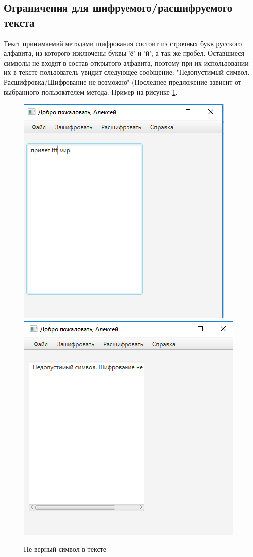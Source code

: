 \documentclass[a4paper,12pt]{article}
\begin{document}
\subsection{Ограничения для шифруемого/расшифруемого текста}
Текст принимаемвй методами шифрования состоит из строчных букв русского алфавита, из которого изключены буквы 'ё' и 'й', а так же пробел. Оставшиеся символы не входят в состав открытого алфавита, поэтому при их использовании их в тексте пользователь увидит следующее сообщение: "Недопустимый символ. Расшифровка/Шифрование не возможно" (Последнее предложение зависит от выбранного пользователем метода. Пример на рисунке \ref{fig:wrong_char_and_response}.
\begin{center}
	\begin{figure}[h!]
		\centering
		\includegraphics[scale=0.7]{img/wrong_char.png}
		\includegraphics[scale=0.7]{img/wrong_char_response.png}
		\caption{Не верный символ в тексте}
		\label{fig:wrong_char_and_response}
	\end{figure}
\end{center}
\end{document}
